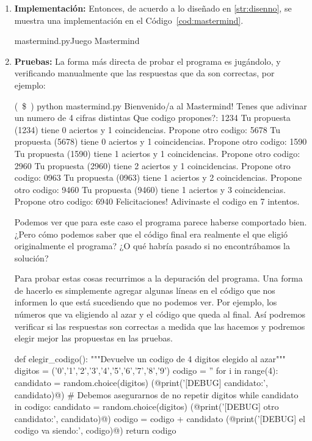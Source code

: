 \begin{enumerate}
\item {\bf Implementación:}
Entonces, de acuerdo a lo diseñado en \ref{str:disenno}, se muestra una
implementación en el Código~\ref{cod:mastermind}.

\begin{codigo}{\label{cod:mastermind} mastermind.py}{Juego Mastermind}

\end{codigo}

\item {\bf Pruebas:}
La forma más directa de probar el programa es jugándolo, y verificando
manualmente que las respuestas que da son correctas, por ejemplo:

\begin{codigo-nohl-sn}
(~\$~) python mastermind.py
Bienvenido/a al Mastermind!
Tenes que adivinar un numero de 4 cifras distintas
Que codigo propones?: 1234
Tu propuesta (1234) tiene 0 aciertos y  1 coincidencias.
Propone otro codigo: 5678
Tu propuesta (5678) tiene 0 aciertos y  1 coincidencias.
Propone otro codigo: 1590
Tu propuesta (1590) tiene 1 aciertos y  1 coincidencias.
Propone otro codigo: 2960
Tu propuesta (2960) tiene 2 aciertos y  1 coincidencias.
Propone otro codigo: 0963
Tu propuesta (0963) tiene 1 aciertos y  2 coincidencias.
Propone otro codigo: 9460
Tu propuesta (9460) tiene 1 aciertos y  3 coincidencias.
Propone otro codigo: 6940
Felicitaciones! Adivinaste el codigo en 7 intentos.
\end{codigo-nohl-sn}

Podemos ver que para este caso el programa parece haberse comportado bien.
¿Pero cómo podemos saber que el código final era realmente el que eligió
originalmente el programa? ¿O qué habría pasado si no encontrábamos la
solución?

Para probar estas cosas recurrimos a la depuración del programa. Una forma
de hacerlo es simplemente agregar algunas líneas en el código que nos
informen lo que está sucediendo que no podemos ver. Por ejemplo, los
números que va eligiendo al azar y el código que queda al final. Así
podremos verificar si las respuestas son correctas a medida que las hacemos
y podremos elegir mejor las propuestas en las pruebas.

\begin{codigo-python-sn}
def elegir_codigo():
    """Devuelve un codigo de 4 digitos elegido al azar"""
    digitos = ('0','1','2','3','4','5','6','7','8','9')
    codigo = ''
    for i in range(4):
        candidato = random.choice(digitos)
        (@print('[DEBUG] candidato:', candidato)@)
        # Debemos asegurarnos de no repetir digitos
        while candidato in codigo:
            candidato = random.choice(digitos)
            (@print('[DEBUG] otro candidato:', candidato)@)
        codigo = codigo + candidato
        (@print('[DEBUG] el codigo va siendo:', codigo)@)
    return codigo
\end{codigo-python-sn}


\end{enumerate}
